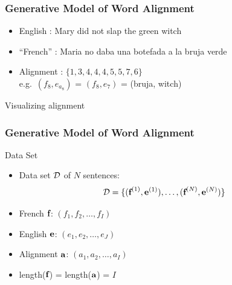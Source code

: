 \begin{frame}
\frametitle{Generative Model of Word Alignment}
\begin{block}{}
\begin{itemize}
\item English \tgt: Mary did not slap the green witch
\item ``French'' \src: Maria no daba una botefada a la bruja verde
\item Alignment \aln: $\{ 1, 3, 4, 4, 4, 5, 5, 7, 6 \}$ \\
e.g.\ $(f_8, e_{a_8})$ = $(f_8, e_7)$ = (bruja, witch)
\end{itemize}
\end{block}\pause
\begin{block}{Visualizing alignment \aln}

\end{block}
\end{frame}

\begin{frame}
\frametitle{Generative Model of Word Alignment}
\begin{block}{Data Set}
\begin{itemize}[<+->]
\item Data set ${\cal D}$ of $N$ sentences:
\[ {\cal D} = \{ (\textbf{f}^{(1)}, \textbf{e}^{(1)}), \ldots, (\textbf{f}^{(N)}, \textbf{e}^{(N)}) \} \]
\item French $\textbf{f}$: $( f_1, f_2, \ldots, f_I )$
\item English $\textbf{e}$: $( e_1, e_2, \ldots, e_J )$
\item Alignment $\textbf{a}$: $( a_1, a_2, \ldots, a_I )$
\item length($\textbf{f}$) = length($\textbf{a}$) = $I$
\end{itemize}
\end{block}
\end{frame}

